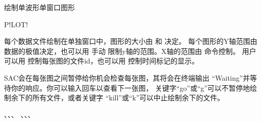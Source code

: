 \label{cmd:plot}

绘制单波形单窗口图形

\begin{SACSTX}
P!LOT!
\end{SACSTX}

每个数据文件绘制在单独窗口中，图形的大小由  和  决定。
每个图形的Y轴范围由数据的极值决定，也可以用  手动
限制y轴的范围。X轴的范围由  命令控制。
用户可以用  控制每张图的文件id，也可以用
  控制时间标记的显示。

SAC会在每张图之间暂停给你机会检查每张图，其将会在终端输出
``Waiting''并等待你的响应。你可以输入回车以查看下一张图，
关键字``go''或``g''可以不暂停地绘制余下的所有文件，或者关键字
``kill''或``k''可以中止绘制余下的文件。

、、、
、、、
